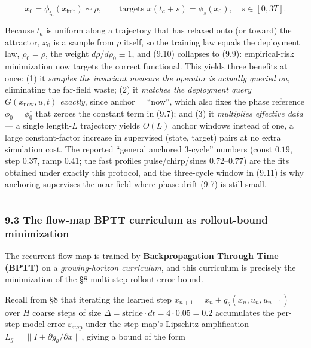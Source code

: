 \documentclass[
  11pt,
]{article}
\begin{document}
\[
x_0=\phi_{t_a}(x_{\text{init}})\sim\rho,\qquad
\text{targets } x(t_a+s)=\phi_{s}(x_0),\quad s\in[0,3T].
\tag{9.11}
\]

Because \(t_a\) is uniform along a trajectory that has relaxed onto (or
toward) the attractor, \(x_0\) is a sample from \(\rho\) itself, so the
training law equals the deployment law, \(\rho_0=\rho\), the weight
\(d\rho/d\rho_0\equiv 1\), and (9.10) collapses to (9.9): empirical-risk
minimization now targets the correct functional. This yields three
benefits at once: (1) it \emph{samples the invariant measure the
operator is actually queried on}, eliminating the far-field waste; (2)
it \emph{matches the deployment query \(G(x_{\text{now}},u,t)\)
exactly}, since anchor = ``now'', which also fixes the phase reference
\(\phi_0=\phi_0^\star\) that zeroes the constant term in (9.7); and (3)
it \emph{multiplies effective data} --- a single length-\(L\) trajectory
yields \(O(L)\) anchor windows instead of one, a large constant-factor
increase in supervised (state, target) pairs at no extra simulation
cost. The reported ``general anchored 3-cycle'' numbers (const \(0.19\),
step \(0.37\), ramp \(0.41\); the fast profiles pulse/chirp/sines
\(0.72\)--\(0.77\)) are the fits obtained under exactly this protocol,
and the three-cycle window in (9.11) is why anchoring supervises the
near field where phase drift (9.7) is still small.

\begin{center}\rule{0.5\linewidth}{0.5pt}\end{center}

\subsubsection{9.3 The flow-map BPTT curriculum as rollout-bound
minimization}\label{the-flow-map-bptt-curriculum-as-rollout-bound-minimization}

The recurrent flow map is trained by \textbf{Backpropagation Through
Time (BPTT)} on a \emph{growing-horizon curriculum}, and this curriculum
is precisely the minimization of the §8 multi-step rollout error bound.

Recall from §8 that iterating the learned step
\(x_{n+1}=x_n+g_\theta(x_n,u_n,u_{n+1})\) over \(H\) coarse steps of
size \(\Delta=\text{stride}\cdot dt=4\cdot0.05=0.2\) accumulates the
per-step model error \(\varepsilon_{\text{step}}\) under the step map's
Lipschitz amplification
\(L_g=\big\lVert I+\partial g_\theta/\partial x\big\rVert\), giving a
bound of the form
\end{document}
